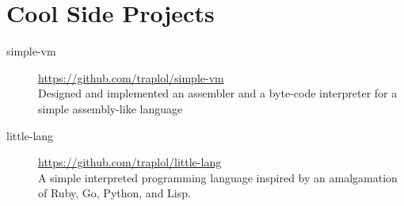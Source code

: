 \documentclass[10pt]{article} %
\begin{document}
\section{Cool Side Projects}
\vspace{-3mm}

\begin{description}
\item[simple-vm]
{\footnotesize \href{https://github.com/traplol/simple-vm}{https://github.com/traplol/simple-vm}} \\
Designed and implemented an assembler and a byte-code interpreter for a simple assembly-like language

\item[little-lang]
{\footnotesize \href{https://github.com/traplol/little-lang}{https://github.com/traplol/little-lang}} \\
A simple interpreted programming language inspired by an amalgamation of Ruby, Go, Python, and Lisp.
\end{description}
\end{document}
